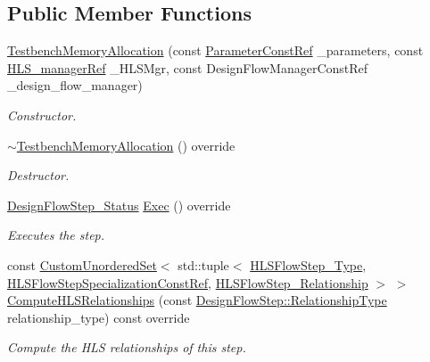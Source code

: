 \subsection*{Public Member Functions}
\begin{DoxyCompactItemize}
\item 
\hyperlink{classTestbenchMemoryAllocation_ac8c474eff29721aced9a039fa2b162bd}{Testbench\+Memory\+Allocation} (const \hyperlink{Parameter_8hpp_a37841774a6fcb479b597fdf8955eb4ea}{Parameter\+Const\+Ref} \+\_\+parameters, const \hyperlink{hls__manager_8hpp_acd3842b8589fe52c08fc0b2fcc813bfe}{H\+L\+S\+\_\+manager\+Ref} \+\_\+\+H\+L\+S\+Mgr, const Design\+Flow\+Manager\+Const\+Ref \+\_\+design\+\_\+flow\+\_\+manager)
\begin{DoxyCompactList}\small\item\em Constructor. \end{DoxyCompactList}\item 
\hyperlink{classTestbenchMemoryAllocation_af738ba6ce2b3d84c1ab6be279faafdb5}{$\sim$\+Testbench\+Memory\+Allocation} () override
\begin{DoxyCompactList}\small\item\em Destructor. \end{DoxyCompactList}\item 
\hyperlink{design__flow__step_8hpp_afb1f0d73069c26076b8d31dbc8ebecdf}{Design\+Flow\+Step\+\_\+\+Status} \hyperlink{classTestbenchMemoryAllocation_a043da976f1d68793e6c264fb105eb7e9}{Exec} () override
\begin{DoxyCompactList}\small\item\em Executes the step. \end{DoxyCompactList}\item 
const \hyperlink{classCustomUnorderedSet}{Custom\+Unordered\+Set}$<$ std\+::tuple$<$ \hyperlink{hls__step_8hpp_ada16bc22905016180e26fc7e39537f8d}{H\+L\+S\+Flow\+Step\+\_\+\+Type}, \hyperlink{hls__step_8hpp_a5fdd2edf290c196531d21d68e13f0e74}{H\+L\+S\+Flow\+Step\+Specialization\+Const\+Ref}, \hyperlink{hls__step_8hpp_a3ad360b9b11e6bf0683d5562a0ceb169}{H\+L\+S\+Flow\+Step\+\_\+\+Relationship} $>$ $>$ \hyperlink{classTestbenchMemoryAllocation_af4e4b578f2465b7694e8e847e8ccfd6d}{Compute\+H\+L\+S\+Relationships} (const \hyperlink{classDesignFlowStep_a723a3baf19ff2ceb77bc13e099d0b1b7}{Design\+Flow\+Step\+::\+Relationship\+Type} relationship\+\_\+type) const override
\begin{DoxyCompactList}\small\item\em Compute the H\+LS relationships of this step. \end{DoxyCompactList}\end{DoxyCompactItemize}
